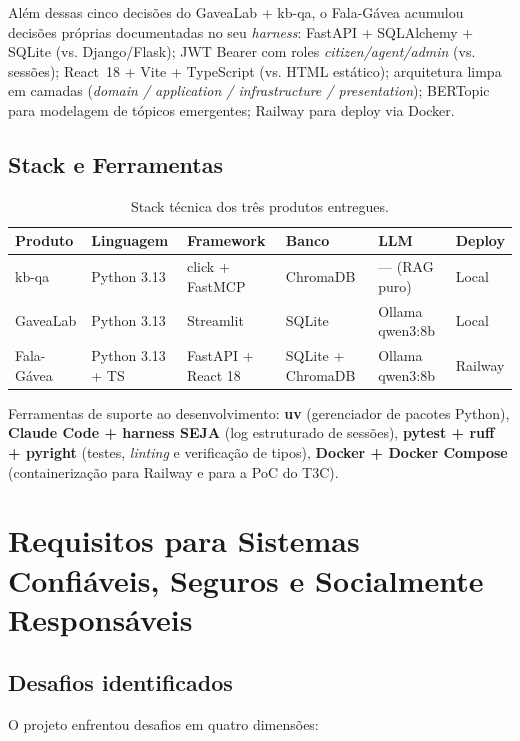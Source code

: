 \documentclass[12pt,a4paper]{article}
\begin{document}
Além dessas cinco decisões do GaveaLab + kb-qa, o Fala-Gávea acumulou decisões próprias
documentadas no seu \textit{harness}: FastAPI + SQLAlchemy + SQLite (vs. Django/Flask);
JWT Bearer com roles \textit{citizen/agent/admin} (vs. sessões); React~18 + Vite + TypeScript
(vs. HTML estático); arquitetura limpa em camadas (\textit{domain / application / infrastructure / presentation});
BERTopic para modelagem de tópicos emergentes; Railway para deploy via Docker.

\subsection{Stack e Ferramentas}

\begin{table}[h!]
\centering
\small
\begin{tabular}{llllll}
\toprule
\textbf{Produto} & \textbf{Linguagem} & \textbf{Framework} & \textbf{Banco} & \textbf{LLM} & \textbf{Deploy} \\
\midrule
kb-qa & Python 3.13 & click + FastMCP & ChromaDB & — (RAG puro) & Local \\
GaveaLab & Python 3.13 & Streamlit & SQLite & Ollama qwen3:8b & Local \\
Fala-Gávea & Python 3.13 + TS & FastAPI + React 18 & SQLite + ChromaDB & Ollama qwen3:8b & Railway \\
\bottomrule
\end{tabular}
\caption{Stack técnica dos três produtos entregues.}
\end{table}

Ferramentas de suporte ao desenvolvimento: \textbf{uv} (gerenciador de pacotes Python),
\textbf{Claude Code + harness SEJA} (log estruturado de sessões), \textbf{pytest + ruff + pyright}
(testes, \textit{linting} e verificação de tipos), \textbf{Docker + Docker Compose}
(containerização para Railway e para a PoC do T3C).

\section{Requisitos para Sistemas Confiáveis, Seguros e Socialmente Responsáveis}

\subsection{Desafios identificados}

O projeto enfrentou desafios em quatro dimensões:
\end{document}
